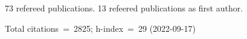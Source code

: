 73 refereed publications. 13 refeered publications as first author.

Total citations~=~2825; h-index~=~29 (2022-09-17)